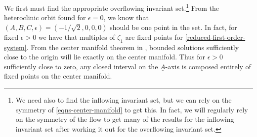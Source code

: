 We first must find the appropriate overflowing invariant set.\footnote{We need also to find the inflowing invariant set, but we can rely on the symmetry of \cref{eqns-center-manifold} to get this. In fact, we will regularly rely on the symmetry of the flow to get many of the results for the inflowing invariant set after working it out for the overflowing invariant set.} From the heteroclinic orbit found for \(\epsilon = 0\), we know that \((A,B,C, \epsilon) = (-1/\sqrt 2 , 0 ,0, 0)\) should be one point in the set. In fact, for fixed \(\epsilon> 0\) we have that multiples of \(\zeta_1\) are fixed points for \cref{reduced-first-order-system}. From the center manifold theorem in \cite{vanderbauwhede1992center}, bounded solutions sufficiently close to the origin will lie exactly on the center manifold. Thus for \(\epsilon>0\) sufficiently close to zero, any closed interval on the \(\underline A\)-axis is composed entirely of fixed points on the center manifold.

